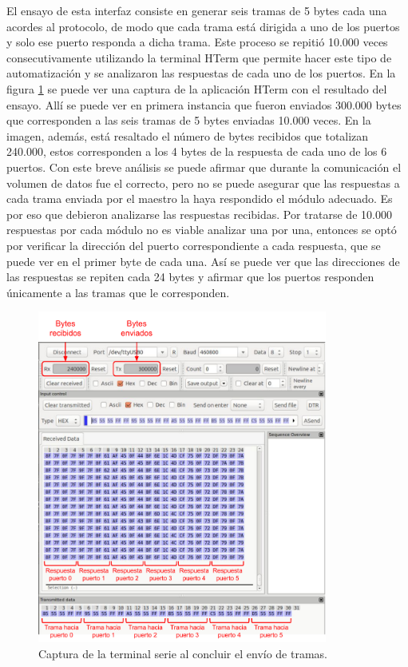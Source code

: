 El ensayo de esta interfaz consiste en generar seis tramas de 5 bytes cada una acordes al protocolo, de modo que cada trama está dirigida a uno de los puertos y solo ese puerto responda a dicha trama. Este proceso se repitió 10.000 veces consecutivamente utilizando la terminal HTerm que permite hacer este tipo de automatización y se analizaron las respuestas de cada uno de los puertos. 
En la figura \ref{fig:AtaqueBytes} se puede ver una captura de la aplicación HTerm con el resultado del ensayo. Allí se puede ver en primera instancia que fueron enviados 300.000 bytes que corresponden a las seis tramas de 5 bytes enviadas 10.000 veces. En la imagen, además, está resaltado el número de bytes recibidos que totalizan 240.000, estos corresponden a los 4 bytes de la respuesta de cada uno de los 6 puertos.
Con este breve análisis se puede afirmar que durante la comunicación el volumen de datos fue el correcto, pero no se puede asegurar que las respuestas a cada trama enviada por el maestro la haya respondido el módulo adecuado.
Es por eso que debieron analizarse las respuestas recibidas. Por tratarse de 10.000 respuestas por cada módulo no es viable analizar una por una, entonces se optó por verificar la dirección del puerto correspondiente a cada respuesta, que se puede ver en el primer byte de cada una. Así se puede ver que las direcciones de las respuestas se repiten cada 24 bytes y afirmar que los puertos responden únicamente a las tramas que le corresponden.

\begin{figure}[H]
	\centering
	\includegraphics[width=0.85\textwidth]{./Figures/AtaqueBytes.pdf}
	\caption{Captura de la terminal serie al concluir el envío de tramas.}
	\label{fig:AtaqueBytes}
\end{figure}

